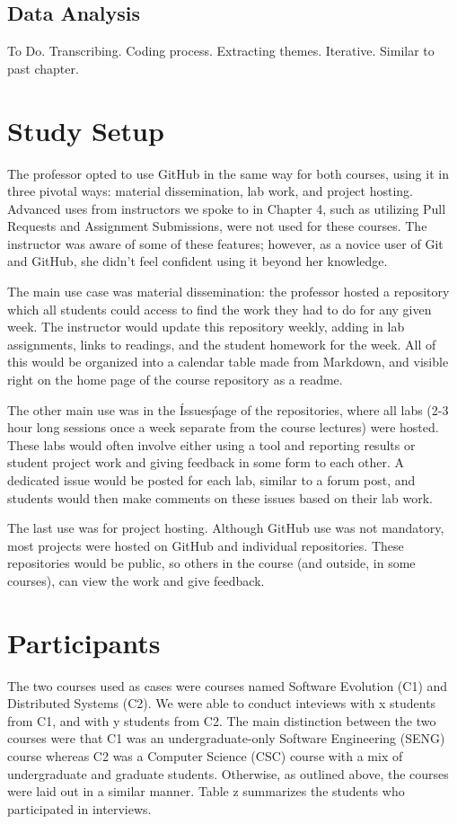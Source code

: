 
\subsection{Data Analysis}
To Do. Transcribing. Coding process. Extracting themes. Iterative. Similar to past chapter.

\section{Study Setup}
The professor opted to use GitHub in the same way for both courses, using it in three pivotal ways: material dissemination, lab work, and project hosting. Advanced uses from instructors we spoke to in Chapter 4, such as utilizing Pull Requests and Assignment Submissions, were not used for these courses. The instructor was aware of some of these features; however, as a novice user of Git and GitHub, she didn't feel confident using it beyond her knowledge.

The main use case was material dissemination: the professor hosted a repository which all students could access to find the work they had to do for any given week. The instructor would update this repository weekly, adding in lab assignments, links to readings, and the student homework for the week. All of this would be organized into a calendar table made from Markdown, and visible right on the home page of the course repository as a readme.

The other main use was in the \'Issues\' page of the repositories, where all labs (2-3 hour long sessions once a week separate from the course lectures) were hosted. These labs would often involve either using a tool and reporting results or student project work and giving feedback in some form to each other. A dedicated issue would be posted for each lab, similar to a forum post, and students would then make comments on these issues based on their lab work.

The last use was for project hosting. Although GitHub use was not mandatory, most projects were hosted on GitHub and individual repositories. These repositories would be public, so others in the course (and outside, in some courses), can view the work and give feedback. %

\section{Participants}
The two courses used as cases were courses named Software Evolution (C1) and Distributed Systems (C2). We were able to conduct inteviews with x students from C1, and with y students from C2. The main distinction between the two courses were that C1 was an undergraduate-only Software Engineering (SENG) course whereas C2 was a Computer Science (CSC) course with a mix of undergraduate and graduate students. Otherwise, as outlined above, the courses were laid out in a similar manner. Table z summarizes the students who participated in interviews.

